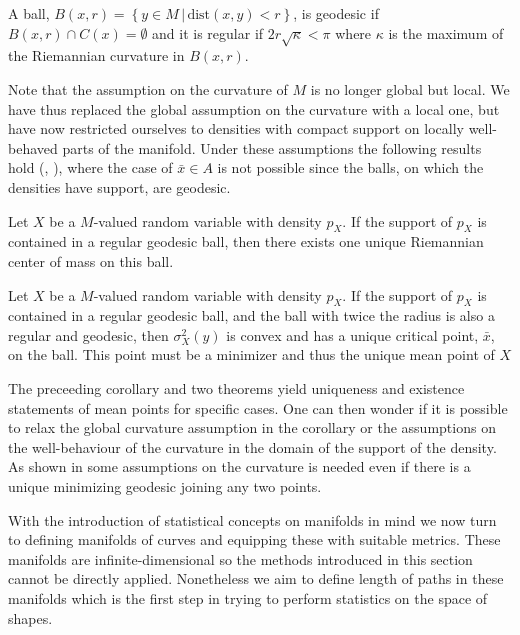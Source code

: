 \begin{definition}
A ball, $B(x,r) = \left\{ y \in M \, | \, \text{dist}(x,y) < r  \right\}$, is geodesic if $B(x,r) \cap C(x) = \emptyset$ and it is regular if $2r \sqrt{\kappa} < \pi$ where $\kappa$ is the maximum of the Riemannian curvature in $B(x,r)$.
\end{definition}

Note that the assumption on the curvature of $M$ is no longer global but local. We have thus replaced the global assumption on the curvature with a local one, but have now restricted ourselves to densities with compact support on locally well-behaved parts of the manifold. Under these assumptions the following results hold (\cite{kendall1990probability}, \cite{karcher1977center}), where the case of $\bar{x} \in A$ is not possible since the balls, on which the densities have support, are geodesic.

\begin{theorem}
Let $X$ be a $M$-valued random variable with density $p_X$. If the support of $p_X$ is contained in a regular geodesic ball, then there exists one unique Riemannian center of mass on this ball.
\end{theorem}

\begin{theorem}
Let $X$ be a $M$-valued random variable with density $p_X$. If the support of $p_X$ is contained in a regular geodesic ball, and the ball with twice the radius is also a regular and geodesic, then $\sigma^2_X(y)$ is convex and has a unique critical point, $\bar{x}$, on the ball. This point must be a minimizer and thus the unique mean point of $X$
\end{theorem}
The preceeding corollary and two theorems yield uniqueness and existence statements of mean points for specific cases. One can then wonder if it is possible to relax the global curvature assumption in the corollary or the assumptions on the well-behaviour of the curvature in the domain of the support of the density. As shown in \cite{kendall1992propeller} some assumptions on the curvature is needed even if there is a unique minimizing geodesic joining any two points.

With the introduction of statistical concepts on manifolds in mind we now turn to defining manifolds of curves and equipping these with suitable metrics. These manifolds are infinite-dimensional so the methods introduced in this section cannot be directly applied. Nonetheless we aim to define length of paths in these manifolds which is the first step in trying to perform statistics on the space of shapes.


